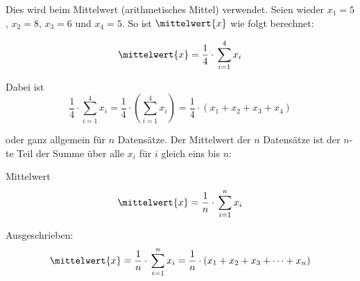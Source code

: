 Dies wird \zB beim Mittelwert (arithmetisches Mittel)
verwendet. Seien wieder $x_1=5$, $x_2=8$, $x_3=6$ und $x_4=5$. So ist
$\mittelwert{x}$ wie folgt berechnet:

$$\mittelwert{x} = \frac{1}{4}\cdot{}\sum_{i=1}^{4}{x_i}$$

Dabei ist $$\frac{1}{4}\cdot{}\sum_{i=1}^{4}{x_i}=\frac{1}{4}\cdot{}\left( \sum_{i=1}^{4}{x_i}\right) =\frac{1}{4}\cdot{}(x_1 + x_2 + x_3 + x_4)$$

oder ganz allgemein für $n$ Datensätze. Der Mittelwert der $n$
Datensätze ist der $n$-te Teil der Summe über alle $x_i$ für $i$
gleich eins bis $n$:

\begin{gesetz}{Mittelwert}{}
$$\mittelwert{x} = \frac{1}{n}\cdot{}\sum_{i=1}^{n}{x_i}$$
\end{gesetz}

Ausgeschrieben:
$$\mittelwert{x} = \frac{1}{n}\cdot{}\sum_{i=1}^{n}{x_i} = \frac{1}{n}\cdot{}(x_1 + x_2 + x_3 + \dots + x_n)$$


\newpage
